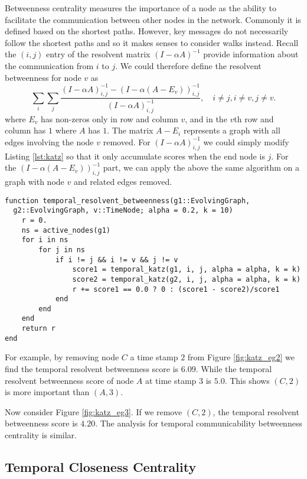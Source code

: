 \documentclass[12pt]{article}
\theoremstyle{definition}
\begin{document}
Betweenness centrality measures the importance of a node as the ability to facilitate the communication between other nodes in the network. Commonly it is defined based on the shortest paths. However, key messages do not necessarily follow the shortest paths and so it makes senses to consider walks instead.
Recall the $(i,j)$ entry of the resolvent matrix $(I - \alpha A)^{-1}$ provide information about the communication from $i$ to $j$. We could therefore define the resolvent betweenness for node $v$ as
\begin{equation}
  \sum_{i}\sum_j \frac{(I-\alpha A)^{-1}_{i,j} - (I - \alpha (A - E_v))^{-1}_{i,j}}{(I - \alpha A)^{-1}_{i,j}}, \quad i \ne j, i \ne v, j \ne v.
\end{equation}
where $E_v$ has non-zeros only in row and column $v$, and in the $v$th row and column has $1$ where $A$ has $1$.
The matrix $A - E_i$ represents a graph with all edges involving the node $v$ removed.
For $(I-\alpha A)^{-1}_{i,j}$ we could simply modify Listing \ref{lst:katz} so that it only accumulate scores when the end node is $j$. For the $(I - \alpha (A-E_v))^{-1}_{i,j}$ part, we can apply the above the same algorithm on a graph with node $v$ and related edges removed.
\begin{lstlisting}
function temporal_resolvent_betweenness(g1::EvolvingGraph,
  g2::EvolvingGraph, v::TimeNode; alpha = 0.2, k = 10)
    r = 0.
    ns = active_nodes(g1)
    for i in ns
        for j in ns
            if i != j && i != v && j != v
                score1 = temporal_katz(g1, i, j, alpha = alpha, k = k)
                score2 = temporal_katz(g2, i, j, alpha = alpha, k = k)
                r += score1 == 0.0 ? 0 : (score1 - score2)/score1
            end
        end
    end
    return r
end
\end{lstlisting}
For example, by removing node $C$ a time stamp $2$ from Figure \ref{fig:katz_eg2} we find
the temporal resolvent betweenness score is $6.09$. While the temporal resolvent betweenness score
of node $A$ at time stamp $3$ is $5.0$. This shows $(C,2)$ is more important than $(A,3)$.

Now consider Figure \ref{fig:katz_eg3}. If we remove $(C,2)$, the temporal resolvent betweenness score is $4.20$.
The analysis for temporal communicability betweenness centrality is similar.

\subsection{Temporal Closeness Centrality}
\label{sec:temp-betw-centr}
\end{document}
